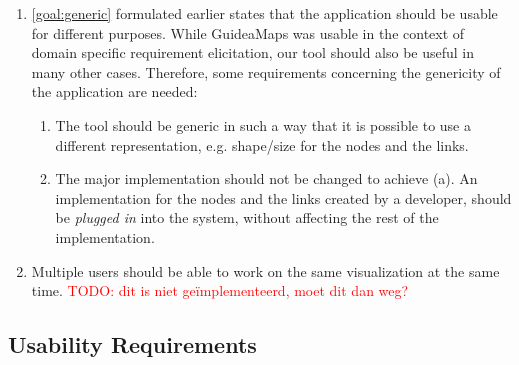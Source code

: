 \begin{enumerate}[label=\textbf{FR \arabic*}., labelindent=0.5cm, ref=FR \arabic*, leftmargin=*]
	\item \label{fr:genericity}
		\ref{goal:generic} formulated earlier states that the application should be usable for different purposes. While GuideaMaps was usable in the context of domain specific requirement elicitation, our tool should also be useful in many other cases. Therefore, some requirements concerning the genericity of the application are needed:
  	\begin{enumerate}
		\item The tool should be generic in such a way that it is possible to use a different representation, e.g. shape/size for the nodes and the links.
		\item The major implementation should not be changed to achieve (a). An implementation for the nodes and the links created by a developer, should be \textit{plugged in} into the system, without affecting the rest of the implementation.
	\end{enumerate}
	
	\item \label{fr:work-simultaneously}
		Multiple users should be able to work on the same visualization at the same time. \textcolor{red}{TODO: dit is niet ge\"implementeerd, moet dit dan weg?}
  
\end{enumerate}



\subsection{Usability Requirements}\label{sec:usability-requirements}

